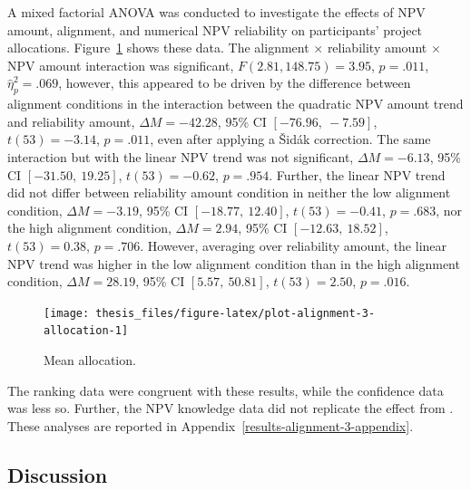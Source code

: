\documentclass[a4paper, nobind, dvipsnames]{templates/ociamthesis}
\theoremstyle{definition}
\theoremstyle{definition}
\theoremstyle{definition}
\theoremstyle{definition}
\theoremstyle{remark}
\begin{document}
A mixed factorial ANOVA was conducted to investigate the effects of NPV amount,
alignment, and numerical NPV reliability on participants' project allocations.
Figure~\ref{fig:plot-alignment-3-allocation} shows these data. The alignment
\(\times\) reliability amount \(\times\) NPV amount interaction was
significant,
\(F(2.81, 148.75) = 3.95\), \(p = .011\), \(\hat{\eta}^2_p = .069\),
however, this appeared to be driven by the difference between alignment
conditions in the interaction between the quadratic NPV amount trend and
reliability amount,
\(\Delta M = -42.28\), 95\% CI \([-76.96,~-7.59]\), \(t(53) = -3.14\), \(p = .011\), even after
applying a Šidák correction. The same interaction but with the linear NPV trend
was not significant,
\(\Delta M = -6.13\), 95\% CI \([-31.50,~19.25]\), \(t(53) = -0.62\), \(p = .954\). Further, the linear
NPV trend did not differ between reliability amount condition in neither the low
alignment condition, \(\Delta M = -3.19\), 95\% CI \([-18.77,~12.40]\), \(t(53) = -0.41\), \(p = .683\), nor
the high alignment condition,
\(\Delta M = 2.94\), 95\% CI \([-12.63,~18.52]\), \(t(53) = 0.38\), \(p = .706\). However, averaging over
reliability amount, the linear NPV trend was higher in the low alignment
condition than in the high alignment condition,
\(\Delta M = 28.19\), 95\% CI \([5.57,~50.81]\), \(t(53) = 2.50\), \(p = .016\).



\begin{figure}
\texttt{[image: thesis\_files/figure-latex/plot-alignment-3-allocation-1]} \caption{Mean allocation.}\label{fig:plot-alignment-3-allocation}
\end{figure}

The ranking data were congruent with these results, while the confidence data
was less so. Further, the NPV knowledge data did not replicate the effect from
\textcite[Study 1]{long2018}. These analyses are reported in
Appendix~\ref{results-alignment-3-appendix}.

\hypertarget{discussion-2}{%
\subsection{Discussion}\label{discussion-2}}
\end{document}
